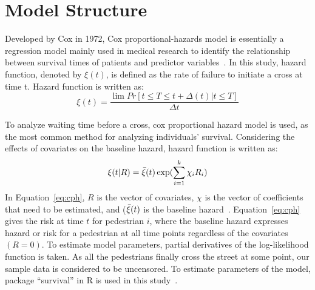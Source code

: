 \section{Model Structure}
\label{S:D4}
Developed by Cox in 1972, Cox proportional-hazards model is essentially a regression model mainly used in medical research to identify the relationship between survival times of patients and predictor variables~\cite{therneau2000cox}. In this study, hazard function, denoted by $\xi(t)$, is defined as the rate of failure to initiate a cross at time t. Hazard function is written as:  
\begin{equation}
    \label{eq:haz}
    \xi(t) = \frac{\lim Pr[t\leq T \leq t+ \Delta (t)|t \leq T]}{\Delta t}	 
\end{equation}

To analyze waiting time before a cross, cox proportional hazard model is used, as the most common method for analyzing individuals’ survival. Considering the effects of covariates on the baseline hazard, hazard function is written as:
\begin{equation}
    \label{eq:cph}
     \xi(t|R) =  \Bar{\xi}(t) \exp({\displaystyle \sum_{i=1}^{k} \chi_i R_i})
\end{equation}
In Equation~\ref{eq:cph}, $R$ is the vector of covariates, $\chi$ is the vector of coefficients that need to be estimated, and ($\Bar{\xi}(t)$ is the baseline hazard~\cite{hamed2001analysis}. Equation~\ref{eq:cph} gives the risk at time $t$ for pedestrian $i$, where the baseline hazard expresses hazard or risk for a pedestrian at all time points regardless of the covariates $(R=0)$. To estimate model parameters, partial derivatives of the log-likelihood function is taken. As all the pedestrians finally cross the street at some point, our sample data is considered to be uncensored. To estimate parameters of the model, package “survival” in R is used in this study~\cite{survival-package}.






